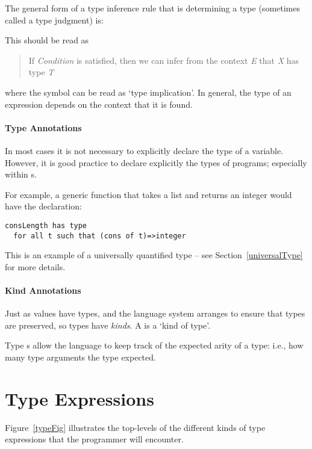 The general form of a type inference rule that is determining a type (sometimes called a type judgment) is:
\begin{prooftree}
\end{prooftree}
This should be read as
\begin{quote}
If \emph{Condition} is satisfied, then we can infer from the context \emph{E} that \emph{X} has type \emph{T}
\end{quote}
where the symbol \tinfers{} can be read as `type implication'. In general, the type of an expression depends on the context that it is found. 

\paragraph{Type Annotations}
In most cases it is not necessary to explicitly declare the type of a variable. However, it is good practice to declare explicitly the types of programs; especially within s.

For example, a generic function  that takes a  list and returns an integer would have the declaration:
\begin{lstlisting}
consLength has type 
  for all t such that (cons of t)=>integer
\end{lstlisting}
This is an example of a universally quantified type -- see Section~\vref{universalType} for more details.

\paragraph{Kind Annotations}
\label{kindAnnotation}
Just as values have types, and the language system arranges to ensure that types are preserved, so types have \emph{kinds}. A  is a `kind of type'.

\begin{aside}
Type s allow the language to keep track of the expected arity of a type: i.e., how many type arguments the type expected.
\end{aside}

\section{Type Expressions}
\label{typeExpressions}

Figure~\vref{typeFig} illustrates the top-levels of the different kinds of type expressions that the \Sr programmer will encounter.

